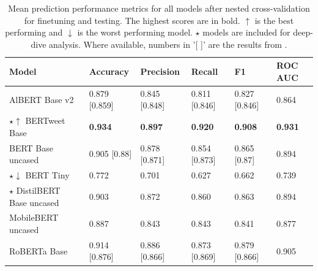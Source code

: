\begin{table}[htbp]
    \centering
    \small %
    \begin{tabularx}{\textwidth}{|X|X|X|X|X|X|}
        \hline
        \rowcolor[gray]{0.7}
        \textbf{Model}                                  & \textbf{Accuracy} & \textbf{Precision} & \textbf{Recall} & \textbf{F1}    & \textbf{ROC AUC} \\
        \hline
        AlBERT Base v2                                  & 0.879 [0.859]     & 0.845 [0.848]      & 0.811 [0.846]   & 0.827 [0.846]  & 0.864            \\
        \rowcolor[gray]{0.9}
        \(\star\)\(\uparrow\) BERTweet Base             & \textbf{0.934}    & \textbf{0.897}     & \textbf{0.920}  & \textbf{0.908} & \textbf{0.931}   \\
        BERT Base uncased                               & 0.905 [0.88]      & 0.878  [0.871]     & 0.854  [0.873]  & 0.865 [0.87]   & 0.894            \\
        \rowcolor[gray]{0.9}
        \(\star\)\(\downarrow\) BERT \vspace{15pt} Tiny & 0.772             & 0.701              & 0.627           & 0.662          & 0.739            \\
        \(\star\) DistilBERT Base uncased               & 0.903             & 0.872              & 0.860           & 0.863          & 0.894            \\
        \rowcolor[gray]{0.9}
        MobileBERT uncased                              & 0.887             & 0.843              & 0.843           & 0.841          & 0.877            \\
        RoBERTa Base                                    & 0.914 [0.876]     & 0.886 [0.866]      & 0.873 [0.869]   & 0.879 [0.866]  & 0.905            \\
        \hline
    \end{tabularx}
    \caption{Mean prediction performance metrics for all models after nested cross-validation for finetuning and testing. The highest scores are in bold. \(\uparrow\) is the best performing and \(\downarrow\) is the worst performing model. \(\star\) models are included for deep-dive analysis. Where available, numbers in '[ ]' are the results from \cite{jin_complaint_2020}.}
    \label{tab: model_mean_metrics}
\end{table}

